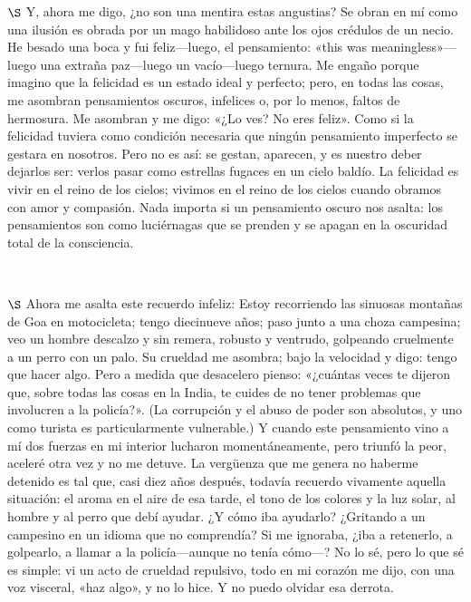 \documentclass[a4paper, 12pt]{article}
\begin{document}
$\S$ Y, ahora me digo, ¿no son una mentira estas angustias? Se obran en mí como
una ilusión es obrada por un mago habilidoso ante los ojos crédulos de un necio.
He besado una boca y fui feliz---luego, el pensamiento: «this was
meaningless»---luego una extraña paz---luego un vacío---luego ternura. Me engaño
porque imagino que la felicidad es un estado ideal y perfecto; pero, en todas
las cosas, me asombran pensamientos oscuros, infelices o, por lo menos, faltos
de hermosura. Me asombran y me digo: «¿Lo ves? No eres feliz». Como si la
felicidad tuviera como condición necesaria que ningún pensamiento imperfecto se
gestara en nosotros. Pero no es así: se gestan, aparecen, y es nuestro deber
dejarlos ser: verlos pasar como estrellas fugaces en un cielo baldío. La
felicidad es vivir en el reino de los cielos; vivimos en el reino de los cielos
cuando obramos con amor y compasión. Nada importa si un pensamiento oscuro nos
asalta: los pensamientos son como luciérnagas que se prenden y se apagan en la
oscuridad total de la consciencia.

~

$\S$ Ahora me asalta este recuerdo infeliz: Estoy recorriendo las sinuosas
montañas de Goa en motocicleta; tengo diecinueve años; paso junto a una choza
campesina; veo un hombre descalzo y sin remera, robusto y ventrudo, golpeando
cruelmente a un perro con un palo. Su crueldad me asombra; bajo la velocidad y
digo: tengo que hacer algo. Pero a medida que desacelero pienso: «¿cuántas veces
te dijeron que, sobre todas las cosas en la India, te cuides de no tener
problemas que involucren a la policía?». (La corrupción y el abuso de poder son
absolutos, y uno como turista es particularmente vulnerable.) Y cuando este
pensamiento vino a mí dos fuerzas en mi interior lucharon momentáneamente, pero
triunfó la peor, aceleré otra vez y no me detuve. La vergüenza que me genera no
haberme detenido es tal que, casi diez años después, todavía recuerdo vivamente
aquella situación: el aroma en el aire de esa tarde, el tono de los colores y la
luz solar, al hombre y al perro que debí ayudar. ¿Y cómo iba ayudarlo? ¿Gritando
a un campesino en un idioma que no comprendía? Si me ignoraba, ¿iba a retenerlo,
a golpearlo, a llamar a la policía---aunque no tenía cómo---? No lo sé, pero lo
que sé es simple: vi un acto de crueldad repulsivo, todo en mi corazón me dijo,
con una voz visceral, «haz algo», y no lo hice. Y no puedo olvidar esa derrota.

~
\end{document}
